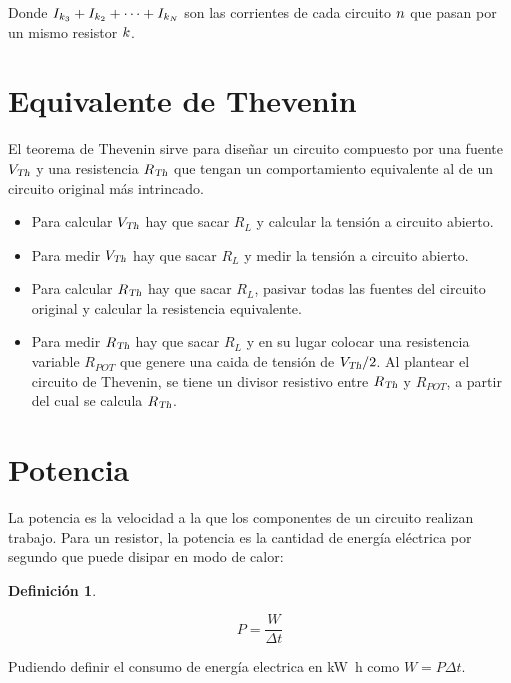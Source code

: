 \documentclass[a5paper,12pt,twoside]{book}
\newtheorem{defn}{{Definición}}[chapter]
\begin{document}
Donde $I_{k_3} + I_{k_2} + \dots + I_{k_N}$ son las corrientes de cada circuito $n$ que pasan por un mismo resistor $k$.


\section{Equivalente de Thevenin}

El teorema de Thevenin sirve para diseñar un circuito compuesto por una fuente ${{V}_\textsl{{Th}}}$ y una resistencia ${{R}_\textsl{{Th}}}$ que tengan un comportamiento equivalente al de un circuito original más intrincado.

\begin{itemize}
\item Para calcular ${{V}_\textsl{{Th}}}$ hay que sacar $R_L$ y calcular la tensión a circuito abierto.
\item Para medir ${{V}_\textsl{{Th}}}$ hay que sacar $R_L$ y medir la tensión a circuito abierto.
\item Para calcular ${{R}_\textsl{{Th}}}$ hay que sacar $R_L$, pasivar todas las fuentes del circuito original y calcular la resistencia equivalente.
\item Para medir ${{R}_\textsl{{Th}}}$ hay que sacar $R_L$ y en su lugar colocar una resistencia variable $R_{POT}$ que genere una caida de tensión de ${{V}_\textsl{{Th}}}/2$. Al plantear el circuito de Thevenin, se tiene un divisor resistivo entre ${{R}_\textsl{{Th}}}$ y $R_{POT}$, a partir del cual se calcula ${{R}_\textsl{{Th}}}$.
\end{itemize}


\section{Potencia}

La potencia es la velocidad a la que los componentes de un circuito realizan trabajo. Para un resistor, la potencia es la cantidad de energía eléctrica por segundo que puede disipar en modo de calor:

\begin{mdframed}[style=MyFrame1]
    \begin{defn}
    \end{defn}
    \begin{equation*}
        P = \frac{W}{\Delta t}
    \end{equation*}
\end{mdframed}

Pudiendo definir el consumo de energía electrica en \si{\kilo\watt\hour} como $W = P \Delta t$.
\end{document}

